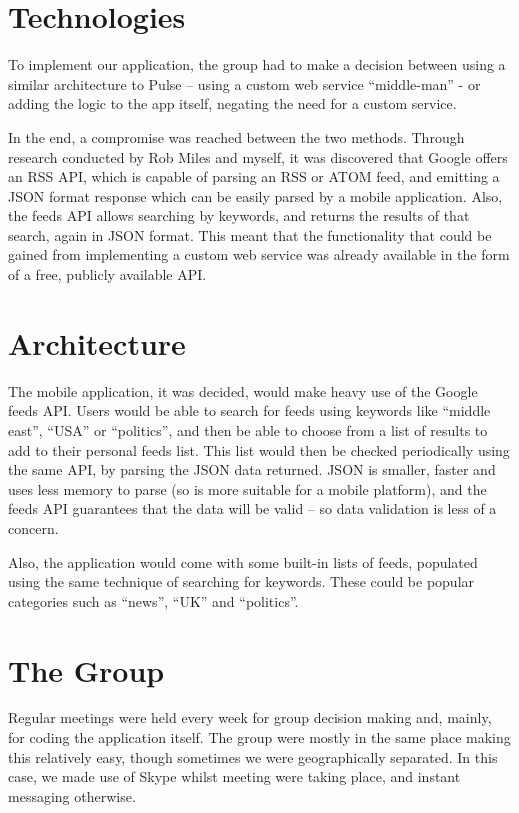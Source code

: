 \documentclass[a4paper,11pt]{article}
\begin{document}
    \section{Technologies}

    To implement our application, the group had to make a decision between
    using a similar architecture to Pulse – using a custom web service
    “middle-man” - or adding the logic to the app itself, negating the need for
    a custom service.

    In the end, a compromise was reached between the two methods. Through
    research conducted by Rob Miles and myself, it was discovered that Google
    offers an RSS API, which is capable of parsing an RSS or ATOM feed, and
    emitting a JSON format response which can be easily parsed by a mobile
    application. Also, the feeds API allows searching by keywords, and returns
    the results of that search, again in JSON format. This meant that the
    functionality that could be gained from implementing a custom web service
    was already available in the form of a free, publicly available API.

    \section{Architecture}

    The mobile application, it was decided, would make heavy use of the Google
    feeds API. Users would be able to search for feeds using keywords like
    “middle east”, “USA” or “politics”, and then be able to choose from a list
    of results to add to their personal feeds list. This list would then be
    checked periodically using the same API, by parsing the JSON data returned.
    JSON is smaller, faster and uses less memory to parse (so is more suitable
    for a mobile platform), and the feeds API guarantees that the data will be
    valid – so data validation is less of a concern.

    Also, the application would come with some built-in lists of feeds,
    populated using the same technique of searching for keywords. These could
    be popular categories such as “news”, “UK” and “politics”.

    \section{The Group}

    Regular meetings were held every week for group decision making and,
    mainly, for coding the application itself. The group were mostly in the
    same place making this relatively easy, though sometimes we were
    geographically separated. In this case, we made use of Skype whilst meeting
    were taking place, and instant messaging otherwise.
\end{document}
